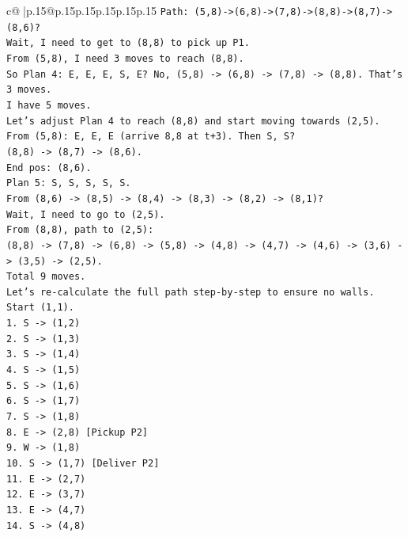 \documentclass{article}
\begin{document}
{\begin{supertabular}{c@{$\;$}|p{.15\linewidth}@{}p{.15\linewidth}p{.15\linewidth}p{.15\linewidth}p{.15\linewidth}p{.15\linewidth}}
{{{\texttt{Path: (5,8){-}>(6,8){-}>(7,8){-}>(8,8){-}>(8,7){-}>(8,6)?} \\
\texttt{Wait, I need to get to (8,8) to pick up P1.} \\
\texttt{From (5,8), I need 3 moves to reach (8,8).} \\
\texttt{So Plan 4: E, E, E, S, E? No, (5,8) {-}> (6,8) {-}> (7,8) {-}> (8,8). That's 3 moves.} \\
\texttt{I have 5 moves.} \\
\texttt{Let's adjust Plan 4 to reach (8,8) and start moving towards (2,5).} \\
\texttt{From (5,8): E, E, E (arrive 8,8 at t+3). Then S, S?} \\
\texttt{(8,8) {-}> (8,7) {-}> (8,6).} \\
\texttt{End pos: (8,6).} \\
\texttt{Plan 5: S, S, S, S, S.} \\
\texttt{From (8,6) {-}> (8,5) {-}> (8,4) {-}> (8,3) {-}> (8,2) {-}> (8,1)?} \\
\texttt{Wait, I need to go to (2,5).} \\
\texttt{From (8,8), path to (2,5):} \\
\texttt{(8,8) {-}> (7,8) {-}> (6,8) {-}> (5,8) {-}> (4,8) {-}> (4,7) {-}> (4,6) {-}> (3,6) {-}> (3,5) {-}> (2,5).} \\
\texttt{Total 9 moves.} \\
\texttt{Let's re{-}calculate the full path step{-}by{-}step to ensure no walls.} \\
\texttt{Start (1,1).} \\
\texttt{1. S {-}> (1,2)} \\
\texttt{2. S {-}> (1,3)} \\
\texttt{3. S {-}> (1,4)} \\
\texttt{4. S {-}> (1,5)} \\
\texttt{5. S {-}> (1,6)} \\
\texttt{6. S {-}> (1,7)} \\
\texttt{7. S {-}> (1,8)} \\
\texttt{8. E {-}> (2,8) {[}Pickup P2{]}} \\
\texttt{9. W {-}> (1,8)} \\
\texttt{10. S {-}> (1,7) {[}Deliver P2{]}} \\
\texttt{11. E {-}> (2,7)} \\
\texttt{12. E {-}> (3,7)} \\
\texttt{13. E {-}> (4,7)} \\
\texttt{14. S {-}> (4,8)} \\
}}}
\end{supertabular}}
\end{document}

